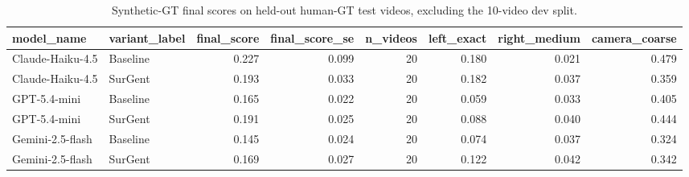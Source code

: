 \begin{table}
\caption{Synthetic-GT final scores on held-out human-GT test videos, excluding the 10-video dev split.}
\label{tab:cvs-act-synthetic-test20-excluding-dev}
\begin{tabular}{llrrrrrr}
\toprule
model_name & variant_label & final_score & final_score_se & n_videos & left_exact & right_medium & camera_coarse \\
\midrule
Claude-Haiku-4.5 & Baseline & 0.227 & 0.099 & 20 & 0.180 & 0.021 & 0.479 \\
Claude-Haiku-4.5 & SurGent & 0.193 & 0.033 & 20 & 0.182 & 0.037 & 0.359 \\
GPT-5.4-mini & Baseline & 0.165 & 0.022 & 20 & 0.059 & 0.033 & 0.405 \\
GPT-5.4-mini & SurGent & 0.191 & 0.025 & 20 & 0.088 & 0.040 & 0.444 \\
Gemini-2.5-flash & Baseline & 0.145 & 0.024 & 20 & 0.074 & 0.037 & 0.324 \\
Gemini-2.5-flash & SurGent & 0.169 & 0.027 & 20 & 0.122 & 0.042 & 0.342 \\
\bottomrule
\end{tabular}
\end{table}

